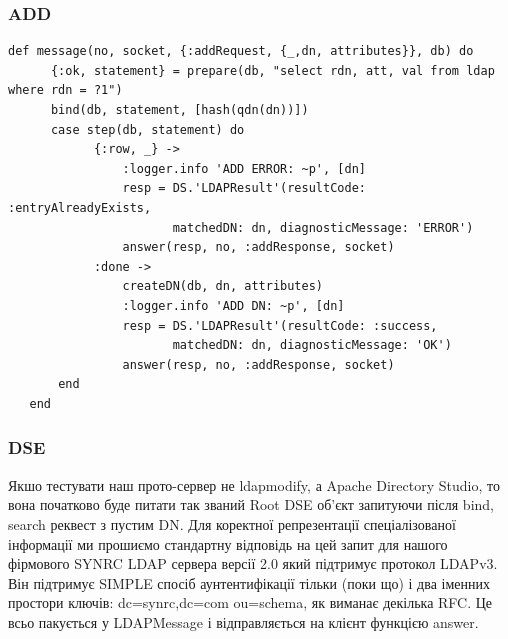 \newpage
\subsubsection{ADD}

\begin{lstlisting}
def message(no, socket, {:addRequest, {_,dn, attributes}}, db) do
      {:ok, statement} = prepare(db, "select rdn, att, val from ldap where rdn = ?1")
      bind(db, statement, [hash(qdn(dn))])
      case step(db, statement) do
            {:row, _} ->
                :logger.info 'ADD ERROR: ~p', [dn]
                resp = DS.'LDAPResult'(resultCode: :entryAlreadyExists,
                       matchedDN: dn, diagnosticMessage: 'ERROR')
                answer(resp, no, :addResponse, socket)
            :done ->
                createDN(db, dn, attributes)
                :logger.info 'ADD DN: ~p', [dn]
                resp = DS.'LDAPResult'(resultCode: :success,
                       matchedDN: dn, diagnosticMessage: 'OK')
                answer(resp, no, :addResponse, socket)
       end
   end
\end{lstlisting}

\newpage
\subsubsection{DSE}

Якшо тестувати наш прото-сервер не ldapmodify, а Apache Directory Studio, то вона початково буде питати так званий Root DSE об'єкт запитуючи після bind, search реквест з пустим DN. Для коректної репрезентації спеціалізованої інформації ми прошиємо стандартну відповідь на цей запит для нашого фірмового SYNRC LDAP сервера версії 2.0 який підтримує протокол LDAPv3. Він підтримує SIMPLE спосіб аунтентифікації тільки (поки що) і два іменних простори ключів: dc=synrc,dc=com ou=schema, як виманає декілька RFC. Це всьо пакується у LDAPMessage і відправляється на клієнт функцією answer.

